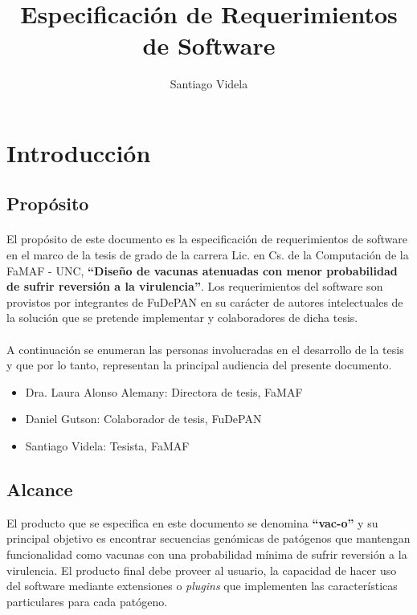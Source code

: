 \documentclass[10pt,a4paper]{article}
\author{Santiago Videla}
\title{Especificaci\'on de Requerimientos de Software}
\begin{document}
\maketitle
\pagebreak
\tableofcontents
\pagebreak

\section{Introducci\'on}
  \subsection{Prop\'osito}
  \paragraph{}
  El prop\'osito de este documento es la especificaci\'on de requerimientos de software en el marco de la tesis de grado de la carrera Lic. en Cs. de la Computaci\'on de la FaMAF - UNC, \textbf{``Dise\~no de vacunas atenuadas con menor probabilidad de sufrir reversi\'on a la virulencia''}. Los requerimientos del software son provistos por integrantes de FuDePAN en su car\'acter de autores intelectuales de la soluci\'on que se pretende implementar y colaboradores de dicha tesis.

  \paragraph{}
  A continuaci\'on se enumeran las personas involucradas en el desarrollo de la tesis y que por lo tanto, representan la principal audiencia del presente documento.
  \begin{itemize}
  \item Dra. Laura Alonso Alemany: Directora de tesis, FaMAF
  \item Daniel Gutson: Colaborador de tesis, FuDePAN
  \item Santiago Videla: Tesista, FaMAF
  \end{itemize}  
 
  \subsection{Alcance}
  El producto que se especifica en este documento se denomina \textbf{``vac-o''} y su principal objetivo es encontrar secuencias gen\'omicas de pat\'ogenos que mantengan funcionalidad como vacunas con una probabilidad m\'inima de sufrir reversi\'on a la virulencia. El producto final debe proveer al usuario, la capacidad de hacer uso del software mediante extensiones o \textit{plugins} que implementen las caracter\'isticas particulares para cada pat\'ogeno. 
  
\end{document}
